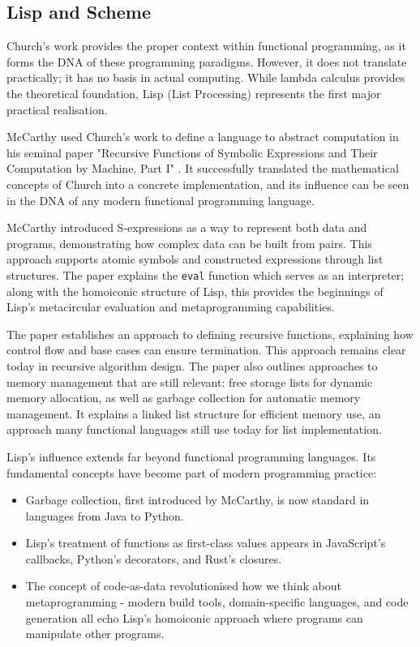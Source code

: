 \documentclass[final]{cmpreport_02}
\begin{document}
\subsection{Lisp and Scheme}

Church's work provides the proper context within functional programming, as it forms the DNA of these programming paradigms. However, it does not translate practically; it has no basis in actual computing. While lambda calculus provides the theoretical foundation, Lisp (List Processing) represents the first major practical realisation.

McCarthy used Church's work to define a language to abstract computation in his seminal paper "Recursive Functions of Symbolic Expressions and Their Computation by Machine, Part I" \cite{mccarthy1960recursive}. It successfully translated the mathematical concepts of Church into a concrete implementation, and its influence can be seen in the DNA of any modern functional programming language.

McCarthy introduced S-expressions as a way to represent both data and programs, demonstrating how complex data can be built from pairs. This approach supports atomic symbols and constructed expressions through list structures. The paper explains the \texttt{eval} function which serves as an interpreter; along with the homoiconic structure of Lisp, this provides the beginnings of Lisp's metacircular evaluation and metaprogramming capabilities.

The paper establishes an approach to defining recursive functions, explaining how control flow and base cases can ensure termination. This approach remains clear today in recursive algorithm design. The paper also outlines approaches to memory management that are still relevant: free storage lists for dynamic memory allocation, as well as garbage collection for automatic memory management. It explains a linked list structure for efficient memory use, an approach many functional languages still use today for list implementation.

Lisp's influence extends far beyond functional programming languages. Its fundamental concepts have become part of modern programming practice:
\begin{itemize}
    \item Garbage collection, first introduced by McCarthy, is now standard in languages from Java to Python.
    \item Lisp's treatment of functions as first-class values appears in JavaScript's callbacks, Python's decorators, and Rust's closures.
    \item The concept of code-as-data revolutionised how we think about metaprogramming - modern build tools, domain-specific languages, and code generation all echo Lisp's homoiconic approach where programs can manipulate other programs.
\end{itemize}
\end{document}
